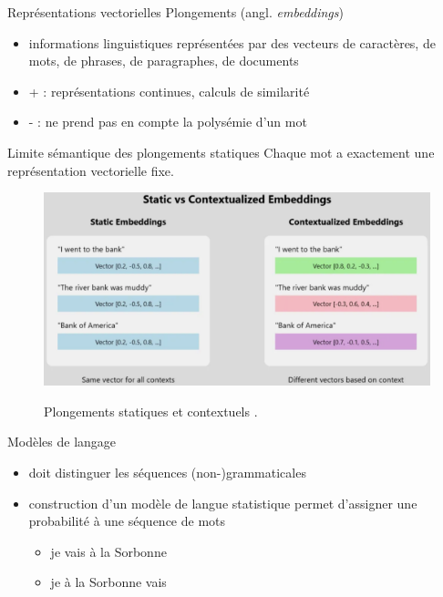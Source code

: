\documentclass[xetex,xcolor={table,usenames,dvipsnames}]{beamer}
\begin{document}
\begin{frame}{Représentations vectorielles}
	Plongements (angl. \textit{embeddings})
	\begin{itemize}
		\item informations linguistiques représentées par des vecteurs de	caractères, de mots, de phrases, de paragraphes, de documents
		\item + : représentations continues, calculs de similarité
		\item - : ne prend pas en compte la polysémie d'un mot
	\end{itemize}

\end{frame}

\begin{frame}{Limite sémantique des plongements statiques}
	Chaque mot a exactement une représentation vectorielle fixe.
	\begin{figure}[h] %
		\centering
		\includegraphics[width=\linewidth]{img/plongements.png}
		\label{fig:plongements}
		\caption{Plongements statiques et contextuels \citep{manikanth2024}.}
	\end{figure}
\end{frame}

\begin{frame}{Modèles de langage}
		\begin{itemize}
		\item doit
		distinguer les séquences (non-)grammaticales
		\item construction d'un modèle de langue statistique permet d'assigner une probabilité à
		une séquence de mots
			\begin{flushright}
			\citep{chomsky1957}
		\end{flushright}
		\begin{itemize}
			\item \og{}je vais à la Sorbonne\fg{} \checkmark
			\item \og{}je à la Sorbonne vais\fg{} \XSolidBrush
		\end{itemize} 
	\end{itemize}

\end{frame}
\end{document}
